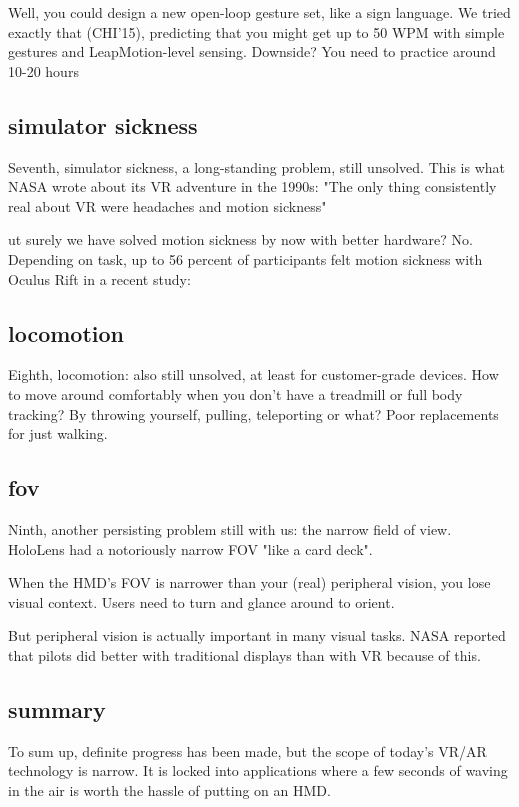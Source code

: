 Well, you could design a new open-loop gesture set, like a sign language. We tried exactly that (CHI'15), predicting that you might get up to 50 WPM with simple gestures and LeapMotion-level sensing. Downside? You need to practice around 10-20 hours


\subsection{simulator sickness}
Seventh, simulator sickness, a long-standing problem, still unsolved. This is what NASA wrote about its VR adventure in the 1990s: "The only thing consistently real about VR were headaches and motion sickness" 

ut surely we have solved motion sickness by now with better hardware? No. Depending on task, up to 56 percent of participants felt motion sickness with Oculus Rift in a recent study: 


\subsection{locomotion}
Eighth, locomotion: also still unsolved, at least for customer-grade devices. How to move around comfortably when you don't have a treadmill or full body tracking? By throwing yourself, pulling, teleporting or what? Poor replacements for just walking.



\subsection{fov}
Ninth, another persisting problem still with us: the narrow field of view. HoloLens had a notoriously narrow FOV "like a card deck". 

When the HMD's FOV is narrower than your (real) peripheral vision, you lose visual context. Users need to turn and glance around to orient. 

But peripheral vision is actually important in many visual tasks. NASA reported that pilots did better with traditional displays than with VR because of this. 


\subsection{summary}
To sum up, definite progress has been made, but the scope of today's VR/AR technology is narrow. It is locked into applications where a few seconds of waving in the air is worth the hassle of putting on an HMD.


